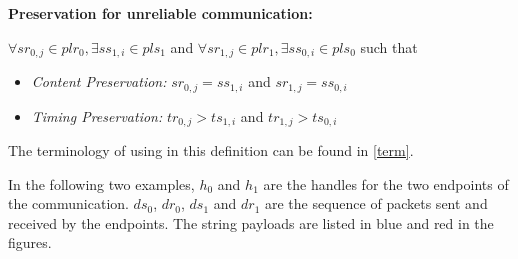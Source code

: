 \textbf{Preservation for unreliable communication:}

$\forall sr_{0,j} \in plr_{0}, \exists ss_{1,i} \in pls_{1}$ and $\forall sr_{1,j} \in plr_{1}, \exists ss_{0,i} \in pls_{0}$ such that
\begin{itemize}
 \item \textit{ Content Preservation:}  $sr_{0,j} = ss_{1,i}$ and $sr_{1,j} = ss_{0,i}$ 
 \item \textit{Timing Preservation:}    $tr_{0,j} > ts_{1,i}$ and $tr_{1,j} > ts_{0,i}$
\end{itemize}
The terminology of using in this definition can be found in \ref{term}.

In the following two examples, $h_{0}$ and $h_{1}$ are the handles for the two endpoints of the communication. $ds_{0}$, $dr_{0}$, $ds_{1}$ and $dr_{1}$ are the sequence of packets sent and received by the endpoints. The string payloads are listed in blue and red in the figures. 

